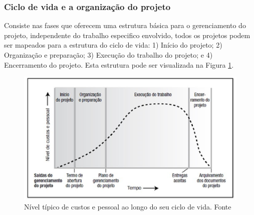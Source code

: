 \subsubsection{Ciclo de vida e a organização do projeto}
Consiste nas fases que oferecem uma estrutura básica para o gerenciamento do projeto, independente do trabalho especifico envolvido, todos os projetos podem ser mapeados para a estrutura do ciclo de vida: 1) Início do projeto; 2) Organização e preparação; 3) Execução do trabalho do projeto; e 4) Encerramento do projeto.  Esta estrutura pode ser visualizada na Figura \ref{fig1}. \cite{pmbok}
\begin{figure}[!htb]
	\centering
		\includegraphics{figuras/fig1.eps}
		\caption{Nível típico de custos e pessoal ao longo do seu ciclo de vida. Fonte \cite{pmbok}}
		\label{fig1}
\end{figure}

